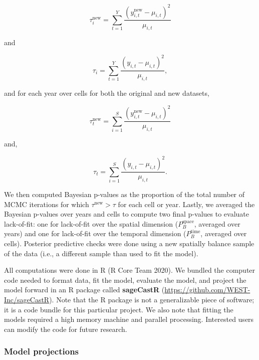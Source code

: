 \documentclass[
  12pt,
]{article}
\begin{document}
\begin{equation}
\tau^{\text{new}}_i = \sum^Y_{t=1} \frac{\left(y^{\text{new}}_{i,t} - \mu_{i,t}\right)^2}{\mu_{i,t}}    
\end{equation}

\noindent{}and

\begin{equation}
\tau_i = \sum^Y_{t=1} \frac{\left(y_{i,t} - \mu_{i,t}\right)^2}{\mu_{i,t}},    
\end{equation}

\noindent{}and for each year over cells for both the original and new datasets,

\begin{equation}
\tau^{\text{new}}_t = \sum^S_{i=1} \frac{\left(y^{\text{new}}_{i,t} - \mu_{i,t}\right)^2}{\mu_{i,t}}    
\end{equation}

\noindent{}and,

\begin{equation}
\tau_t = \sum^S_{i=1} \frac{\left(y_{i,t} - \mu_{i,t}\right)^2}{\mu_{i,t}}.    
\end{equation}

\noindent{}We then computed Bayesian p-values as the proportion of the total number of MCMC iterations for which \(\tau^{\text{new}} > \tau\) for each cell or year.
Lastly, we averaged the Bayesian p-values over years and cells to compute two final p-values to evaluate lack-of-fit: one for lack-of-fit over the spatial dimension (\(P_B^{\text{space}}\), averaged over years) and one for lack-of-fit over the temporal dimension (\(P_B^{\text{time}}\), averaged over cells).
Posterior predictive checks were done using a new spatially balance sample of the data (i.e., a different sample than used to fit the model).

All computations were done in R (R Core Team 2020).
We bundled the computer code needed to format data, fit the model, evaluate the model, and project the model forward in an R package called \textbf{sageCastR} (\url{https://github.com/WEST-Inc/sageCastR}).
Note that the R package is not a generalizable piece of software; it is a code bundle for this particular project.
We also note that fitting the models required a high memory machine and parallel processing.
Interested users can modify the code for future research.

\hypertarget{model-projections}{%
\subsubsection{Model projections}\label{model-projections}}
\end{document}
